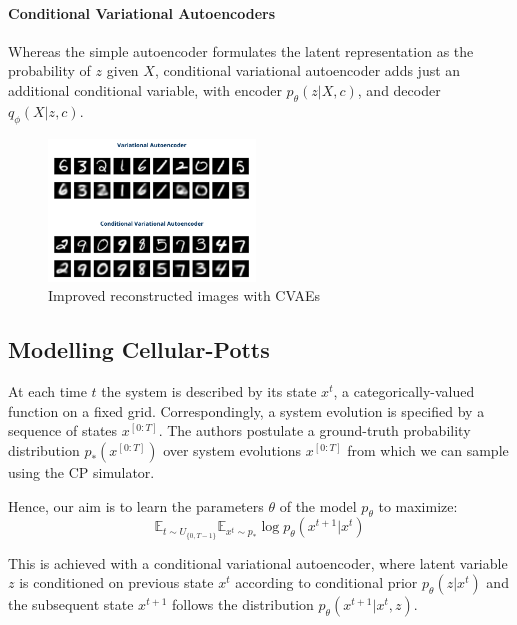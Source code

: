 \documentclass[a4paper,10pt,twocolumn]{article}
\begin{document}
            \paragraph{Conditional Variational Autoencoders}
            Whereas the simple autoencoder formulates the latent representation as the probability of
            $z$ given $X$, conditional variational autoencoder adds just an additional conditional variable, 
            with encoder $p_\theta (z | X, c)$, and decoder $q_\phi (X | z, c)$\cite{cvaes}.

            \begin{figure}[H]
                \centering
                \includegraphics[width=0.49\textwidth]{../images/vae_vs_cvae.png}
                \caption{Improved reconstructed images with CVAEs}\label{fig:vae_vs_cvae}
            \end{figure}


        \subsection{Modelling Cellular-Potts}
            At each time $t$ the system is described by its state $x^t$, a
            categorically-valued function on a fixed grid. 
            Correspondingly, a system evolution is specified by a sequence of states $x^{[0:T]}$.
            The authors postulate a ground-truth probability distribution $p_*(x^{[0:T]})$\cite{minartz_cpm} 
            over system evolutions $x^{[0:T]}$ from which we can sample using the CP simulator. 
            
            Hence, our aim is to learn the parameters $\theta$ of the model $p_\theta$ to maximize:
            \begin{equation}
                \mathbb{E}_{t \sim U_{\{0,T-1\}}} \mathbb{E}_{x^t \sim p_*} \log p_\theta(x^{t+1} | x^t)
            \end{equation}

            This is achieved with a conditional variational autoencoder, where latent variable 
            $z$ is conditioned on previous state $x^t$ according to conditional prior
            $p_\theta(z|x^t)$ and the subsequent state $x^{t+1}$ follows the 
            distribution $p_\theta(x^{t+1} | x^t, z)$.
\end{document}
